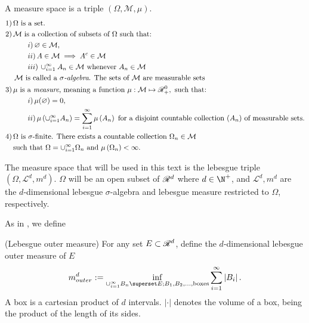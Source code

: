 \begin{definition}
\begin{definition}
\begin{definition}
	A measure space is a triple $(\Omega, \mathcal{M}, \mu)$. 
	\begin{align}
		1) \,&\Omega \text{ is a set.} \\
		2) \,&\mathcal{M} \text{ is a collection of subsets of $\Omega$ such that:} \\
		&\quad \quad i)\, \varnothing \in \mathcal{M},   \\
		&\quad \quad ii) \,A \in \mathcal{M} \implies A^c \in \mathcal{M}  \\
		&\quad \quad iii) \,\cup_{i = 1}^\infty A_n \in \mathcal{M} \text{ whenever } A_n \in \mathcal{M}\\ 
		&\, \mathcal{M} \text{ is called a \emph{$\sigma$-algebra}. The sets of $\mathcal{M}$ are measurable sets}\\
		3) \,& \mu \text{ is a \emph{measure}, meaning a function } \mu : \mathcal{M} \mapsto \mathscr{R}^0_+, \text{ such that:} \\ 
		&\quad \quad i)\, \mu(\varnothing) = 0, \\
		&\quad \quad ii)\, \mu\left(\cup_{i = 1}^\infty A_n\right) = \sum_{i = 1}^\infty \mu\left( A_n \right) \text{ for a disjoint countable collection $\left(A_n\right)$ of measurable sets.} \\
		4) \,&\Omega \text{ is $\sigma$-finite. There exists a countable collection $\Omega_n \in \mathcal{M}$} \\
		&\text{such that $\Omega = \cup_{i = 1}^\infty \Omega_n$ and $\mu\left(\Omega_n\right) < \infty$.} 
	\end{align}                                                                 
\end{definition}

The measure space that will be used in this text is the lebesgue triple $(\Omega, \mathcal{L}^d, m^d)$.  $\Omega$ will be an open subset of $\mathscr{R}^d$ where $d \in \N^+$, and $\mathcal{L}^d, m^d$ are the $d$-dimensional lebesgue $\sigma$-algebra and lebesgue measure restricted to $\Omega$, respectively. 

As in \cite[Definition 1.2.2][p. 20]{tao2011introduction}, we define
\begin{definition} (Lebesgue outer measure)
	For any set $E \subset \mathscr{R}^d$, define the $d$-dimensional lebesgue outer measure of $E$
	\begin{equation}
		m^d_{outer} := \inf_{\cup_{i = 1}^\infty B_n \superset E; B_1,B_2,..., \text{boxes}} \sum_{i = 1}^{\infty} \left| B_i \right|.
	\end{equation}
	A box is a cartesian product of $d$ intervals. $\left|\cdot \left|$ denotes the volume of a box, being the product of the length of its sides. 
\end{definition}


\end{definition}
\end{definition}
